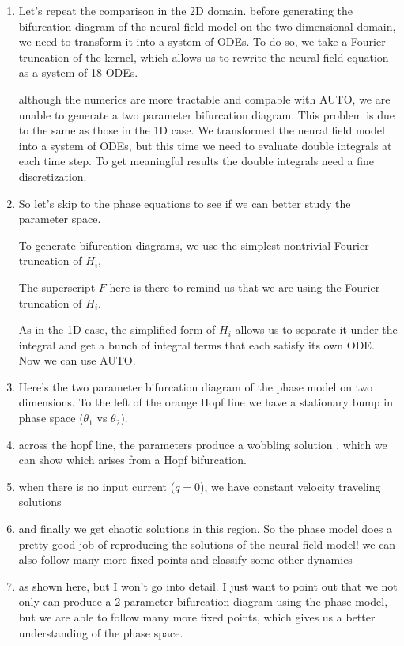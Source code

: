 \documentclass[a4paper,14pt]{article}
\begin{document}
\begin{enumerate}
 \item Let's repeat the comparison in the 2D domain. before generating the bifurcation diagram of the neural field model on the two-dimensional domain, we need to transform it into a system of ODEs. To do so, we take a Fourier truncation of the kernel, which allows us to rewrite the neural field equation as a system of 18 ODEs.
 
 although the numerics are more tractable and compable with AUTO, we are unable to generate a two parameter bifurcation diagram. This problem is due to the same as those in the 1D case. We transformed the neural field model into a system of ODEs, but this time we need to evaluate double integrals at each time step. To get meaningful results the double integrals need a fine discretization.

\item So let's skip to the phase equations to see if we can better study the parameter space.

To generate bifurcation diagrams, we use the simplest nontrivial Fourier truncation of $H_i$,

The superscript $F$ here is there to remind us that we are using the Fourier truncation of $H_i$.

As in the 1D case, the simplified form of $H_i$ allows us to separate it under the integral and get a bunch of integral terms that each satisfy its own ODE. Now we can use AUTO.

\item Here's the two parameter bifurcation diagram of the phase model on two dimensions. To the left of the orange Hopf line we have a stationary bump in phase space ($\theta_1$ vs $\theta_2$).

\item across the hopf line, the parameters produce a wobbling solution , which we can show which arises from a Hopf bifurcation.

\item when there is no input current ($q=0$), we have constant velocity traveling solutions

\item and finally we get chaotic solutions in this region. So the phase model does a pretty good job of reproducing the solutions of the neural field model! we can also follow many more fixed points and classify some other dynamics

\item as shown here, but I won't go into detail. I just want to point out that we not only can produce a 2 parameter bifurcation diagram using the phase model, but we are able to follow many more fixed points, which gives us a better understanding of the phase space.


\end{enumerate}
\end{document}
